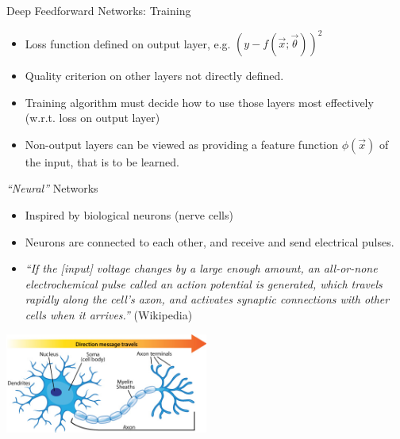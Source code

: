 \begin{vbframe}{Deep Feedforward Networks: Training}

\vfill

\begin{itemize}
\item Loss function defined on output layer, e.g. $(y - f(\vec x; \vec \theta))^2$
\item Quality criterion on other layers not directly defined.
\item Training algorithm must decide how to use those layers most effectively (w.r.t. loss on output layer)
\item Non-output layers can be viewed as providing a feature function $\phi(\vec x)$ of the input, that is to be learned.
\end{itemize}
\begin{center}
\end{center}

\vfill

\end{vbframe}



\begin{vbframe}{\emph{``Neural''} Networks}

\vfill

\begin{itemize}
\item Inspired by biological neurons (nerve cells)
\item Neurons are connected to each other, and receive and send electrical pulses.
\item \emph{``If the [input] voltage changes by a large enough amount, an all-or-none electrochemical pulse called an action potential is generated, which travels rapidly along the cell's axon, and activates synaptic connections with other cells when it arrives.''} (Wikipedia)
\end{itemize}

\begin{center}
\includegraphics[width = 0.5\textwidth]{./figure/neuron_anatomy}
\end{center}


\vfill

\end{vbframe}



